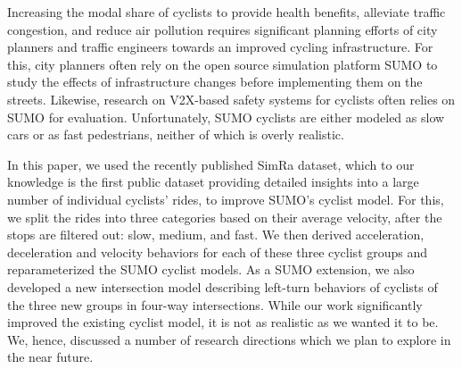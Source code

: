 Increasing the modal share of cyclists to provide health benefits, alleviate traffic congestion, and reduce air pollution requires significant planning efforts of city planners and traffic engineers towards an improved cycling infrastructure.
For this, city planners often rely on the open source simulation platform SUMO to study the effects of infrastructure changes before implementing them on the streets.
Likewise, research on V2X-based safety systems for cyclists often relies on SUMO for evaluation.
Unfortunately, SUMO cyclists are either modeled as slow cars or as fast pedestrians, neither of which is overly realistic.

In this paper, we used the recently published SimRa dataset, which to our knowledge is the first public dataset providing detailed insights into a large number of individual cyclists' rides, to improve SUMO's cyclist model.
For this, we split the rides into three categories based on their average velocity, after the stops are filtered out: slow, medium, and fast.
We then derived acceleration, deceleration and velocity behaviors for each of these three cyclist groups and reparameterized the SUMO cyclist models.
As a SUMO extension, we also developed a new intersection model describing left-turn behaviors of cyclists of the three new groups in four-way intersections.
While our work significantly improved the existing cyclist model, it is not as realistic as we wanted it to be.
We, hence, discussed a number of research directions which we plan to explore in the near future.
